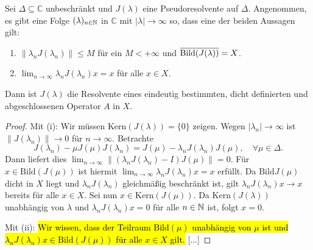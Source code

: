 \begin{folg}
Sei $\Delta\subseteq \mathbb C$ unbeschränkt und $J(\lambda)$ eine Pseudoresolvente auf $\Delta$. Angenommen, es gibt eine Folge $(\lambda)_{n\in\mathbb{N}}$ in $\mathbb C$ mit $|\lambda|\to\infty$ so, dass eine der beiden Aussagen gilt:
\begin{enumerate}
\item $\|\lambda_nJ(\lambda_n)\|\leq M$ für ein $M<+\infty$ und $\overline{\textnormal{Bild}(J(\lambda))}=X$.
\item $ \lim_{n\to\infty}\lambda_n J(\lambda_n)x=x$ für alle $x\in X$.
\end{enumerate}
Dann ist $J(\lambda)$ die Resolvente eines eindeutig bestimmten, dicht definierten und abgeschlossenen Operator $A$ in $X$.
\end{folg}

\begin{proof}
Mit (i): Wir müssen $\text{Kern}(J(\lambda))=\{0\}$ zeigen. Wegen $|\lambda_n|\to\infty$ ist $\|J(\lambda_n)\|\to 0$ für $n\to\infty$.  Betrachte
\begin{equation*}
    J(\lambda_n)-\mu J(\mu)J(\lambda_n)=J(\mu)-\lambda_n J(\lambda_n)J(\mu),\quad\forall \mu\in\Delta.
\end{equation*}
Dann liefert  dies $\lim_{n\to\infty}\|(\lambda_n J(\lambda_n)-I)J(\mu)\|=0$. Für $x\in \text{Bild}(J(\mu))$ ist hiermit $\lim_{n\to\infty}\lambda_n J(\lambda_n)x=x$ erfüllt. Da $\text{Bild} J(\mu)$ dicht in $X$ liegt und $\lambda_n J(\lambda_n)$ gleichmäßig beschränkt ist, gilt $\lambda_n J(\lambda_n)x\to x$ bereits für alle $x\in X$. Sei nun $x\in \text{Kern}(J(\mu))$. Da $\text{Kern}(J(\lambda))$ unabhängig von $\lambda$  und $\lambda_n J(\lambda_n)x=0$ für alle $n\in\mathbb{N}$ ist, folgt $x=0$.

\par
Mit (ii): \hl{Wir wissen, dass der Teilraum $\text{Bild}(\mu)$ unabhängig von $\mu$ ist und $\lambda_n J(\lambda_n)x\in \text{Bild}(J(\mu))$ für alle $x\in X$ gilt.} [...]
\end{proof}

